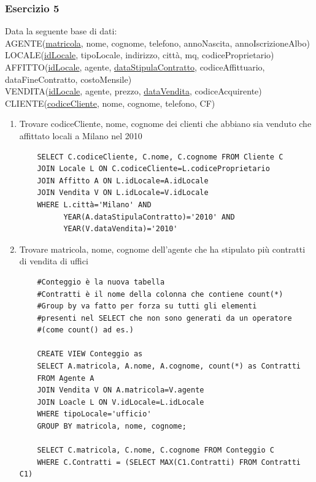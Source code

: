 \documentclass[a4paper]{article}
\begin{document}
\subsubsection{Esercizio 5}
Data la seguente base di dati:\medskip\\
AGENTE(\underline{matricola}, nome, cognome, telefono, annoNascita, annoIscrizioneAlbo)\\
LOCALE(\underline{idLocale}, tipoLocale, indirizzo, città, mq, codiceProprietario)\\
AFFITTO(\underline{idLocale}, agente, \underline{dataStipulaContratto}, codiceAffittuario, dataFineContratto, costoMensile)\\
VENDITA(\underline{idLocale}, agente, prezzo, \underline{dataVendita}, codiceAcquirente)\\
CLIENTE(\underline{codiceCliente}, nome, cognome, telefono, CF)\medskip
\begin{enumerate}
  \item Trovare codiceCliente, nome, cognome dei clienti che abbiano sia venduto che affittato locali a Milano nel 2010
  \begin{verbatim}
    SELECT C.codiceCliente, C.nome, C.cognome FROM Cliente C
    JOIN Locale L ON C.codiceCliente=L.codiceProprietario
    JOIN Affitto A ON L.idLocale=A.idLocale
    JOIN Vendita V ON L.idLocale=V.idLocale
    WHERE L.città='Milano' AND
          YEAR(A.dataStipulaContratto)='2010' AND
          YEAR(V.dataVendita)='2010'
  \end{verbatim}
  \item Trovare matricola, nome, cognome dell'agente che ha stipulato più contratti di vendita di uffici
  \begin{verbatim}
    #Conteggio è la nuova tabella
    #Contratti è il nome della colonna che contiene count(*)
    #Group by va fatto per forza su tutti gli elementi
    #presenti nel SELECT che non sono generati da un operatore
    #(come count() ad es.)

    CREATE VIEW Conteggio as
    SELECT A.matricola, A.nome, A.cognome, count(*) as Contratti
    FROM Agente A
    JOIN Vendita V ON A.matricola=V.agente
    JOIN Loacle L ON V.idLocale=L.idLocale
    WHERE tipoLocale='ufficio'
    GROUP BY matricola, nome, cognome;

    SELECT C.matricola, C.nome, C.cognome FROM Conteggio C
    WHERE C.Contratti = (SELECT MAX(C1.Contratti) FROM Contratti C1)
  \end{verbatim}
\end{enumerate}
\end{document}
